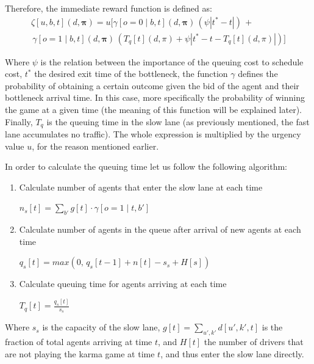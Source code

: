 \documentclass[a4paper,11pt,twoside]{book}
\begin{document}
Therefore, the immediate reward function is defined as:
\begin{equation}
    \begin{split}
        \zeta[u,b,t](d,\bm{\pi}) = u \Bigg[\gamma[o=0 \mid b,t](d,\bm{\pi}) \, (\psi |t^*-t|) \, + \\
        \, \gamma[o=1 \mid b,t](d,\bm{\pi}) \, (T_q[t](d,\pi) + \psi |t^*-t-T_q[t](d,\pi)|)\Bigg]
    \end{split}
\end{equation}

Where $\psi$ is the relation between the importance of the queuing cost to schedule cost, $t^*$ the desired exit time of the bottleneck, the function $\gamma$ defines the probability of obtaining a certain outcome given the bid of the agent and their bottleneck arrival time. In this case, more specifically the probability of winning the game at a given time (the meaning of this function will be explained later). Finally, $T_q$ is the queuing time in the slow lane (as previously mentioned, the fast lane accumulates no traffic). The whole expression is multiplied by the urgency value $u$, for the reason mentioned earlier.

In order to calculate the queuing time let us follow the following algorithm:

\begin{enumerate}
    \item Calculate number of agents that enter the slow lane at each time
    \begin{center}
        $n_s[t] = \sum_{b'} g[t] \cdot \gamma[o=1 \mid t,b']$
    \end{center}
    \item Calculate number of agents in the queue after arrival of new agents at each time 
    \begin{center}
        $q_s[t] = max(0, \, q_s[t-1] + n[t] - s_s + H[s])$
    \end{center}
    \item Calculate queuing time for agents arriving at each time 
    \begin{center}
        $T_q[t] = \frac{q_s[t]}{s_s}$
    \end{center}
\end{enumerate}

Where $s_s$ is the capacity of the slow lane, \(g[t] = \sum_{u',k'} d[u',k',t]\) is the fraction of total agents arriving at time $t$, and $H[t]$ the number of drivers that are not playing the karma game at time $t$, and thus enter the slow lane directly.
\end{document}
